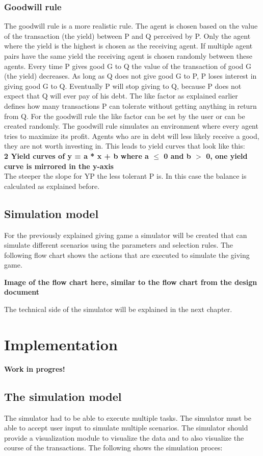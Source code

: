 \documentclass[twoside,openright]{uva-bachelor-thesis}
\begin{document}
\subsection{Goodwill rule}
The goodwill rule is a more realistic rule. The agent is chosen based on the value of the transaction (the yield) between P and Q perceived by P. Only the agent where the yield is the highest is chosen as the receiving agent. If multiple agent pairs have the same yield the receiving agent is chosen randomly between these agents. Every time P gives good G to Q the value of the transaction of good G (the yield) decreases. As long as Q does not give good G to P, P loses interest in giving good G to Q. Eventually P will stop giving to Q, because P does not expect that Q will ever pay of his debt. The like factor as explained earlier defines how many transactions P can tolerate without getting anything in return from Q. For the goodwill rule the like factor can be set by the user or can be created randomly. The goodwill rule simulates an environment where every agent tries to maximize its profit. Agents who are in debt will less likely receive a good, they are not worth investing in.
This leads to yield curves that look like this: \\
\textbf{2 Yield curves of y = a * x + b where a $\le$ 0 and b $>$ 0, one yield curve is mirrored in the y-axis}\\
The steeper the slope for YP the less tolerant P is. In this case the balance is calculated as explained before.

\section{Simulation model}
For the previously explained giving game a simulator will be created that can simulate different scenarios using the parameters and selection rules. The following flow chart shows the actions that are executed to simulate the giving game.

\textbf{Image of the flow chart here, similar to the flow chart from the design document}

The technical side of the simulator will be explained in the next chapter. 


\chapter{Implementation}
\textbf{Work in progres!}
\section{The simulation model}
The simulator had to be able to execute multiple tasks. The simulator must be able to accept user input to simulate multiple scenarios. The simulator should provide a visualization module to visualize the data and to also visualize the course of the transactions. The following shows the simulation proces:
\end{document}
